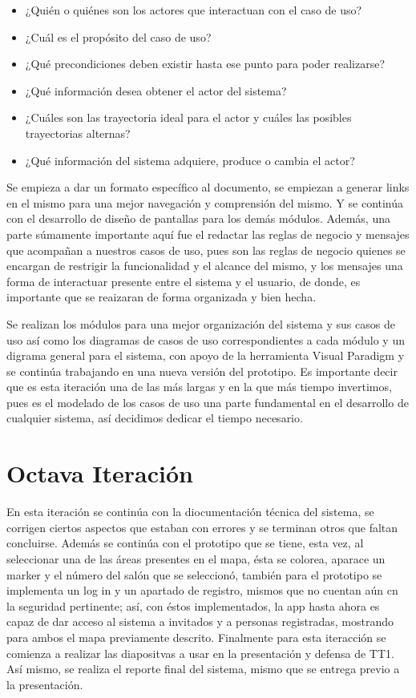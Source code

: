 \begin{itemize}
	\item ¿Quién o quiénes son los actores que interactuan con el caso de uso?
	\item ¿Cuál es el propósito del caso de uso?
	\item ¿Qué precondiciones deben existir hasta ese punto para poder realizarse?
	\item ¿Qué información desea obtener el actor del sistema?
	\item ¿Cuáles son las trayectoria ideal para el actor y cuáles las posibles trayectorias alternas?
	\item ¿Qué información del sistema adquiere, produce o cambia el actor?
\end{itemize}

\noindent
Se empieza a dar un formato específico al documento, se empiezan a generar links en el mismo para una mejor navegación y comprensión del mismo. Y se continúa con el desarrollo de diseño de pantallas para los demás módulos. 
Además, una parte súmamente importante aquí fue el redactar las reglas de negocio y mensajes que acompañan a nuestros casos de uso, pues son las reglas de negocio quienes se encargan de restrigir la funcionalidad y el alcance del mismo, y los mensajes una forma de interactuar presente entre el sistema y el usuario, de donde, es importante que se reaizaran de forma organizada y bien hecha. 

\noindent
Se realizan los módulos para una mejor organización del sistema y sus casos de uso así como los diagramas de casos de uso correspondientes a cada módulo y un digrama general para el sistema, con apoyo de la herramienta Visual Paradigm y se continúa trabajando en una nueva versión del prototipo. Es importante decir que es esta iteración una de las más largas y en la que más tiempo invertimos, pues es el modelado de los casos de uso una parte fundamental en el desarrollo de cualquier sistema, así decidimos dedicar el tiempo necesario. 

\section{Octava Iteración}
En esta iteración se continúa con la diocumentación técnica del sistema, se corrigen ciertos aspectos que estaban con errores y se terminan otros que faltan concluirse. Además se continúa con el prototipo que se tiene, esta vez, al seleccionar una de las áreas presentes en el mapa, ésta se colorea, aparace un marker y el número del salón que se seleccionó, también para el prototipo se implementa un log in y un apartado de registro, mismos que no cuentan aún cn la seguridad pertinente; así, con éstos implementados, la app hasta ahora es capaz de dar acceso al sistema a invitados y a personas registradas, mostrando para ambos el mapa previamente descrito. 
Finalmente para esta iteracción se comienza a realizar las diapositvas a usar en la presentación y defensa de TT1. Así mismo, se realiza el reporte final del sistema, mismo que se entrega previo a la presentación. 


